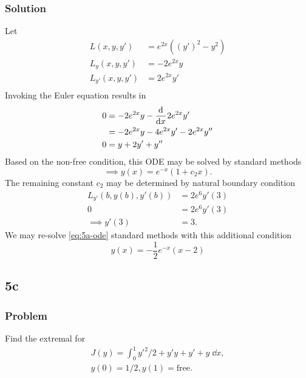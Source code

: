 \documentclass[12pt,twoside]{article}
\begin{document}
\subsubsection*{Solution}
Let
\begin{align*}
  L(x,y,y') &= e^{2 x} \left({\left(y'\right)}^2-y^2\right) \\
  L_y(x,y,y') &= -2 e^{2 x} y \\
  L_{y'}(x,y,y') &= 2 e^{2 x} y' \\
\end{align*}
Invoking the Euler equation results in
\begin{equation}
\label{eq:5a-ode}
\begin{aligned}
  0 &= -2 e^{2 x} y - \frac{\mathrm{d}^{} {}}{\mathrm{d}{x}^{}}2 e^{2 x} y' \\
    &= -2 e^{2 x} y - 4e^{2x}y' - 2e^{2x}y'' \\
  0 &= y + 2y' + y''
\end{aligned}
\end{equation}
Based on the non-free condition, this ODE may be solved by standard methods
\begin{equation*}
  \implies y(x) = e^{-x}(1+c_2x).
\end{equation*}
The remaining constant $c_2$ may be determined by natural boundary condition
\begin{align*}
  L_{y'}(b,y(b),y'(b)) &= 2 e^{6} y'(3) \\
  0 &= 2e^{6}y'(3) \\
  \implies y'(3) &= 3.
\end{align*}
We may re-solve \cref{eq:5a-ode} standard methods with this additional condition
\begin{equation*}
  \boxed{y(x) = -\frac{1}{2} e^{-x} (x-2)}
\end{equation*}

\subsection{5c}
\subsubsection*{Problem}
Find the extremal for
\begin{equation}
  \label{eq:5b-problem}
  \begin{aligned}
    J(y) = \int_0^1 y'^2/2+y'y+y'+y\;\dd{x}, \\
    y(0)=1/2, y(1)=\text{free}. \\
  \end{aligned}
\end{equation}
\end{document}

